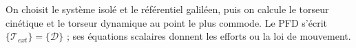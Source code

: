 \begin{corrigebox}[Corrigé]
On choisit le système isolé et le référentiel galiléen, puis on calcule le torseur cinétique et le torseur dynamique au point le plus commode. Le PFD s'écrit $\{\mathcal T_{ext}\}=\{\mathcal D\}$ ; ses équations scalaires donnent les efforts ou la loi de mouvement.
\end{corrigebox}
